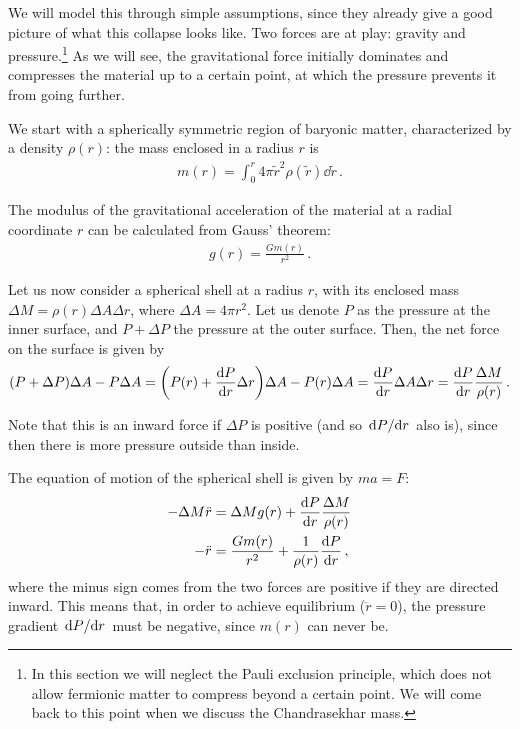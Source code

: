 \documentclass[main.tex]{subfiles}
\begin{document}
We will model this through simple assumptions, since they already give a good picture of what this collapse looks like. Two forces are at play: gravity and pressure.\footnote{In this section we will neglect the Pauli exclusion principle, which does not allow fermionic matter to compress beyond a certain point. We will come back to this point when we discuss the Chandrasekhar mass.}
As we will see, the gravitational force initially dominates and compresses the material up to a certain point, at which the pressure prevents it from going further.

We start with a spherically symmetric region of baryonic matter, characterized by a density \(\rho (r)\): the mass enclosed in a radius \(r\) is 
%
\begin{align}
  m(r) = \int_{0}^{r} 4 \pi \widetilde{r}^2 \rho (\widetilde{r}) \dd{\widetilde{r}}
\,.
\end{align}

The modulus of the gravitational acceleration of the material at a radial coordinate \(r\) can be calculated from Gauss' theorem: 
%
\begin{align}
  g(r) = \frac{G m(r)}{r^2}
\,. 
\end{align}
%

Let us now consider a spherical shell at a radius \(r\), with its enclosed mass \(\Delta M = \rho (r) \Delta A \Delta r\), where \(\Delta A = 4 \pi r^2\).
Let us denote \(P\) as the pressure at the inner surface, and \(P + \Delta P\) the pressure at the outer surface. Then, the net force on the surface is given by
%
\begin{align}
\qty(P + \Delta P) \Delta A - P \Delta A 
= \qty(P(r) + \dv{P}{r}\Delta r) \Delta A - P(r) \Delta A 
= \dv{P}{r} \Delta A \Delta r
= \dv{P}{r} \frac{\Delta M}{\rho (r)}
\,.
\end{align}

Note that this is an inward force if \(\Delta P\) is positive (and so \(\dv*{P}{r}\) also is), since then there is more pressure outside than inside. 

The equation of motion of the spherical shell is given by \(ma = F\):
%
\begin{align}
  - \Delta M \ddot{r} &= \Delta M g(r) + \dv{P}{r} \frac{\Delta M}{\rho (r)} \\
  - \ddot{r} &= \frac{G m(r)}{r^2} + \frac{1}{\rho (r)} \dv{P}{r} 
\,,
\end{align}
%
where the minus sign comes from the two forces are positive if they are directed inward.
This means that, in order to achieve equilibrium (\(\ddot{r} = 0\)), the pressure gradient \(\dv*{P}{r} \) must be negative, since \(m(r)\) can never be.
\end{document}
